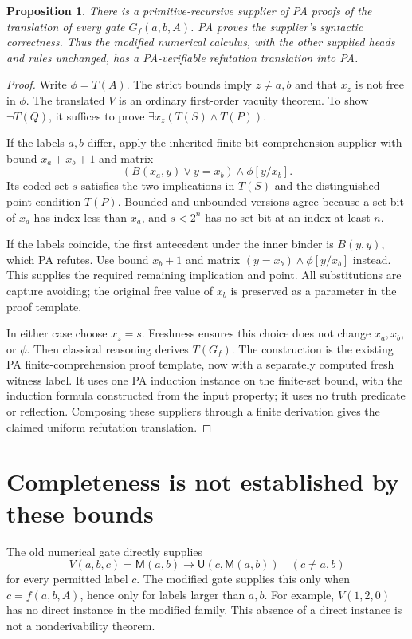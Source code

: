 \documentclass[11pt]{article}
\newtheorem{proposition}{Proposition}
\newcommand{\M}{\mathsf M}
\newcommand{\U}{\mathsf U}
\begin{document}
\begin{proposition}
There is a primitive-recursive supplier of PA proofs of the translation
of every gate $G_f(a,b,A)$. PA proves the supplier's syntactic correctness.
Thus the modified numerical calculus, with the other supplied heads and
rules unchanged, has a PA-verifiable refutation translation into PA.
\end{proposition}
\begin{proof}
Write $\phi=T(A)$. The strict bounds imply $z\ne a,b$ and that $x_z$
is not free in $\phi$. The translated $V$ is an ordinary first-order
vacuity theorem. To show $\neg T(Q)$, it suffices to prove
$\exists x_z(T(S)\wedge T(P))$.

If the labels $a,b$ differ, apply the inherited finite bit-comprehension
supplier with bound $x_a+x_b+1$ and matrix
\[
 (B(x_a,y)\lor y=x_b)\wedge\phi[y/x_b].
\]
Its coded set $s$ satisfies the two implications in $T(S)$ and the
distinguished-point condition $T(P)$. Bounded and unbounded versions agree
because a set bit of $x_a$ has index less than $x_a$, and $s<2^n$ has no set
bit at an index at least $n$.

If the labels coincide, the first antecedent under the inner binder is
$B(y,y)$, which PA refutes. Use bound $x_b+1$ and matrix
$(y=x_b)\wedge\phi[y/x_b]$ instead. This supplies the required remaining
implication and point. All substitutions are capture avoiding; the original
free value of $x_b$ is preserved as a parameter in the proof template.

In either case choose $x_z=s$. Freshness ensures this choice does not
change $x_a,x_b$, or $\phi$. Then classical reasoning derives $T(G_f)$.
The construction is the existing PA finite-comprehension proof template,
now with a separately computed fresh witness label. It uses one PA
induction instance on the finite-set bound, with the induction formula
constructed from the input property; it uses no truth predicate or reflection.
Composing these suppliers through a finite derivation gives the claimed
uniform refutation translation.
\end{proof}

\section{Completeness is not established by these bounds}
The old numerical gate directly supplies
\[
 V(a,b,c)=\M(a,b)\to\U(c,\M(a,b))
 \quad(c\ne a,b)
\]
for every permitted label $c$. The modified gate supplies this only when
$c=f(a,b,A)$, hence only for labels larger than $a,b$. For example,
$V(1,2,0)$ has no direct instance in the modified family.
This absence of a direct instance is not a nonderivability theorem.
\end{document}
